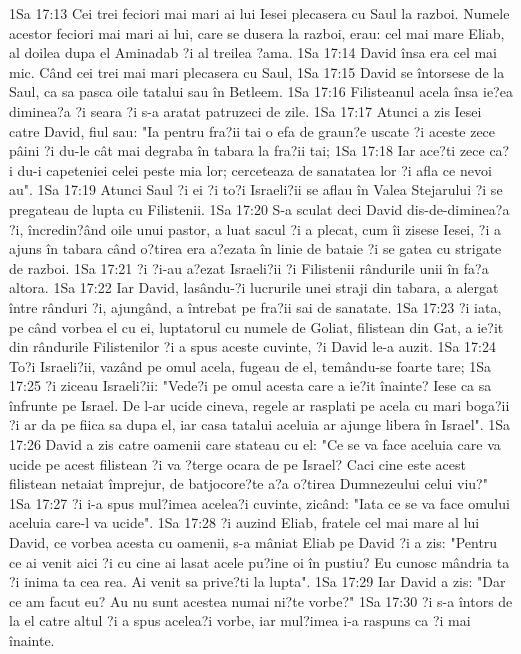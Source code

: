 1Sa 17:13  Cei trei feciori mai mari ai lui Iesei plecasera cu Saul la razboi. Numele acestor feciori mai mari ai lui, care se dusera la razboi, erau: cel mai mare Eliab, al doilea dupa el Aminadab ?i al treilea ?ama.
1Sa 17:14  David însa era cel mai mic. Când cei trei mai mari plecasera cu Saul,
1Sa 17:15  David se întorsese de la Saul, ca sa pasca oile tatalui sau în Betleem.
1Sa 17:16  Filisteanul acela însa ie?ea diminea?a ?i seara ?i s-a aratat patruzeci de zile.
1Sa 17:17  Atunci a zis Iesei catre David, fiul sau: "Ia pentru fra?ii tai o efa de graun?e uscate ?i aceste zece pâini ?i du-le cât mai degraba în tabara la fra?ii tai;
1Sa 17:18  Iar ace?ti zece ca?i du-i capeteniei celei peste mia lor; cerceteaza de sanatatea lor ?i afla ce nevoi au".
1Sa 17:19  Atunci Saul ?i ei ?i to?i Israeli?ii se aflau în Valea Stejarului ?i se pregateau de lupta cu Filistenii.
1Sa 17:20  S-a sculat deci David dis-de-diminea?a ?i, încredin?ând oile unui pastor, a luat sacul ?i a plecat, cum îi zisese Iesei, ?i a ajuns în tabara când o?tirea era a?ezata în linie de bataie ?i se gatea cu strigate de razboi.
1Sa 17:21  ?i ?i-au a?ezat Israeli?ii ?i Filistenii rândurile unii în fa?a altora.
1Sa 17:22  Iar David, lasându-?i lucrurile unei straji din tabara, a alergat între rânduri ?i, ajungând, a întrebat pe fra?ii sai de sanatate.
1Sa 17:23  ?i iata, pe când vorbea el cu ei, luptatorul cu numele de Goliat, filistean din Gat, a ie?it din rândurile Filistenilor ?i a spus aceste cuvinte, ?i David le-a auzit.
1Sa 17:24  To?i Israeli?ii, vazând pe omul acela, fugeau de el, temându-se foarte tare;
1Sa 17:25  ?i ziceau Israeli?ii: "Vede?i pe omul acesta care a ie?it înainte? Iese ca sa înfrunte pe Israel. De l-ar ucide cineva, regele ar rasplati pe acela cu mari boga?ii ?i ar da pe fiica sa dupa el, iar casa tatalui aceluia ar ajunge libera în Israel".
1Sa 17:26  David a zis catre oamenii care stateau cu el: "Ce se va face aceluia care va ucide pe acest filistean ?i va ?terge ocara de pe Israel? Caci cine este acest filistean netaiat împrejur, de batjocore?te a?a o?tirea Dumnezeului celui viu?"
1Sa 17:27  ?i i-a spus mul?imea acelea?i cuvinte, zicând: "Iata ce se va face omului aceluia care-l va ucide".
1Sa 17:28  ?i auzind Eliab, fratele cel mai mare al lui David, ce vorbea acesta cu oamenii, s-a mâniat Eliab pe David ?i a zis: "Pentru ce ai venit aici ?i cu cine ai lasat acele pu?ine oi în pustiu? Eu cunosc mândria ta ?i inima ta cea rea. Ai venit sa prive?ti la lupta".
1Sa 17:29  Iar David a zis: "Dar ce am facut eu? Au nu sunt acestea numai ni?te vorbe?"
1Sa 17:30  ?i s-a întors de la el catre altul ?i a spus acelea?i vorbe, iar mul?imea i-a raspuns ca ?i mai înainte.
